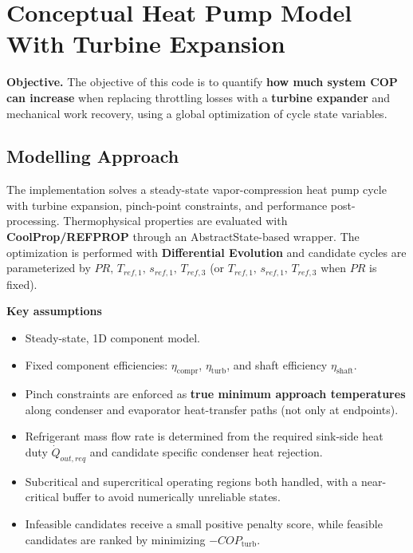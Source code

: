 
\section{Conceptual Heat Pump Model With Turbine Expansion}

\textbf{Objective.} The objective of this code is to quantify \textbf{how much system COP can increase} when replacing throttling losses with a \textbf{turbine expander} and mechanical work recovery, using a global optimization of cycle state variables.

\subsection{Modelling Approach}

The implementation solves a steady-state vapor-compression heat pump cycle with turbine expansion, pinch-point constraints, and performance post-processing. Thermophysical properties are evaluated with \textbf{CoolProp/REFPROP} through an AbstractState-based wrapper. The optimization is performed with \textbf{Differential Evolution} and candidate cycles are parameterized by \(PR,\,T_{ref,1},\,s_{ref,1},\,T_{ref,3}\) (or \(T_{ref,1},\,s_{ref,1},\,T_{ref,3}\) when \(PR\) is fixed).

\textbf{Key assumptions}
\begin{itemize}
\item Steady-state, 1D component model.
\item Fixed component efficiencies: $\eta_{\mathrm{compr}}$, $\eta_{\mathrm{turb}}$, and shaft efficiency $\eta_{\mathrm{shaft}}$.
\item Pinch constraints are enforced as \textbf{true minimum approach temperatures} along condenser and evaporator heat-transfer paths (not only at endpoints).
\item Refrigerant mass flow rate is determined from the required sink-side heat duty $\dot Q_{out,req}$ and candidate specific condenser heat rejection.
\item Subcritical and supercritical operating regions both handled, with a near-critical buffer to avoid numerically unreliable states.
\item Infeasible candidates receive a small positive penalty score, while feasible candidates are ranked by minimizing $-COP_{\mathrm{turb}}$.
\end{itemize}

